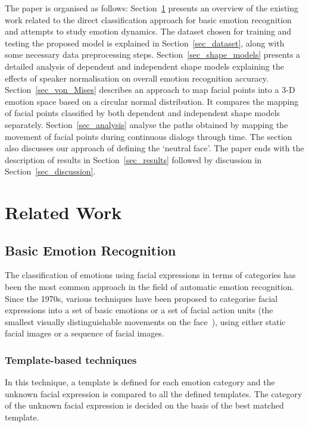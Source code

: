 \documentclass[10pt,journal,cspaper,compsoc]{IEEEtran}
\begin{document}
The paper is organised as follows: Section~\ref{sec_related_work} presents an overview of the existing work related to the direct classification approach for basic emotion recognition and attempts to study emotion dynamics. The dataset chosen for training and testing the proposed model is explained in Section~\ref{sec_dataset}, along with some necessary data preprocessing steps. Section~\ref{sec_shape_models} presents a detailed analysis of dependent and independent shape models explaining the effects of speaker normalisation on overall emotion recognition accuracy. Section~\ref{sec_von_Mises} describes an approach to map facial points into a 3-D emotion space based on a circular normal distribution. It compares the mapping of facial points classified by both dependent and independent shape models separately. Section~\ref{sec_analysis} analyse the paths obtained by mapping the movement of facial points during continuous dialogs through time. The section also discusses our approach of defining the `neutral face'. The paper ends with the description of results in Section~\ref{sec_results} followed by discussion in Section~\ref{sec_discussion}.

\section{Related Work}
\label{sec_related_work}

\subsection{Basic Emotion Recognition}
\label{sec_basic_emo_rec}
The classification of emotions using facial expressions in terms of categories has been the most common approach in the field of automatic emotion recognition. Since the 1970s, various techniques have been proposed to categorise facial expressions into a set of basic emotions or a set of facial action units (the smallest visually distinguishable movements on the face~\cite{Ekman78}), using either static facial images or a sequence of facial images.

\subsubsection{Template-based techniques}

In this technique, a template is defined for each emotion category and the unknown facial expression is compared to all the defined templates. The category of the unknown facial expression is decided on the basis of the best matched template.
\end{document}
